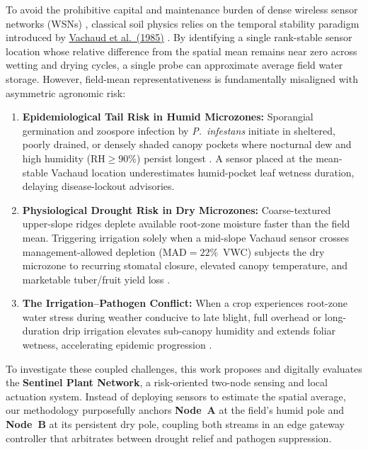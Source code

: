 \documentclass[10pt,twocolumn,a4paper]{article}
\begin{document}
To avoid the prohibitive capital and maintenance burden of dense wireless sensor networks (WSNs) \cite{mao2020_lowcost}, classical soil physics relies on the temporal stability paradigm introduced by \href{https://iwaponline.com/ws/article/22/5/5070/88251/Temporal-stability-of-soil-water-content-in}{Vachaud et al.\ (1985)} \cite{vachaud1985_iwa,guber2008_catena}. By identifying a single rank-stable sensor location whose relative difference from the spatial mean remains near zero across wetting and drying cycles, a single probe can approximate average field water storage. However, field-mean representativeness is fundamentally misaligned with asymmetric agronomic risk:
\begin{enumerate}\setlength{\itemsep}{1pt}\setlength{\parskip}{0pt}
  \item \textbf{Epidemiological Tail Risk in Humid Microzones:} Sporangial germination and zoospore infection by \textit{P.\ infestans} initiate in sheltered, poorly drained, or densely shaded canopy pockets where nocturnal dew and high humidity ($\mathrm{RH} \ge 90\%$) persist longest \cite{wallin1962,msu_svalue}. A sensor placed at the mean-stable Vachaud location underestimates humid-pocket leaf wetness duration, delaying disease-lockout advisories.
  \item \textbf{Physiological Drought Risk in Dry Microzones:} Coarse-textured upper-slope ridges deplete available root-zone moisture faster than the field mean. Triggering irrigation solely when a mid-slope Vachaud sensor crosses management-allowed depletion ($\mathrm{MAD} = 22\%$~VWC) subjects the dry microzone to recurring stomatal closure, elevated canopy temperature, and marketable tuber/fruit yield loss \cite{idso1981_usda,scielo_cwsi}.
  \item \textbf{The Irrigation--Pathogen Conflict:} When a crop experiences root-zone water stress during weather conducive to late blight, full overhead or long-duration drip irrigation elevates sub-canopy humidity and extends foliar wetness, accelerating epidemic progression \cite{cabi_blight2014}.
\end{enumerate}

To investigate these coupled challenges, this work proposes and digitally evaluates the \textbf{Sentinel Plant Network}, a risk-oriented two-node sensing and local actuation system. Instead of deploying sensors to estimate the spatial average, our methodology purposefully anchors \textbf{Node~A} at the field's humid pole and \textbf{Node~B} at its persistent dry pole, coupling both streams in an edge gateway controller that arbitrates between drought relief and pathogen suppression.
\end{document}

